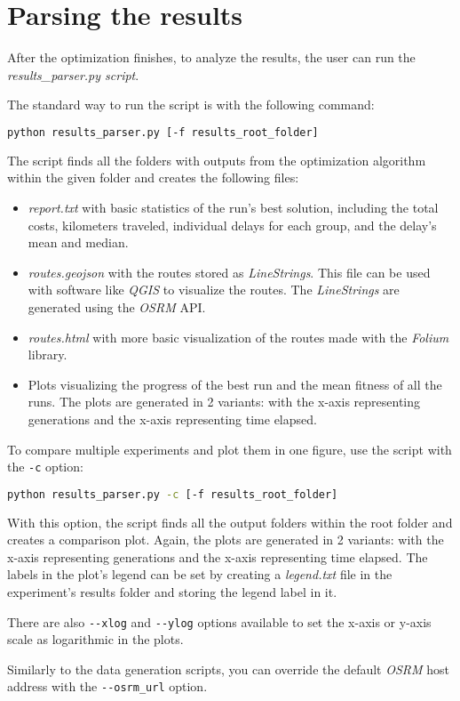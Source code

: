 \section{Parsing the results}

After the optimization finishes, to analyze the results, the user can run the \textit{results\_parser.py script}.

The standard way to run the script is with the following command:

\begin{lstlisting}[language=bash]
    python results_parser.py [-f results_root_folder] 
\end{lstlisting}

The script finds all the folders with outputs from the optimization algorithm within the given folder and creates the following files:

\begin{itemize}
    \setlength\itemsep{0pt}
    \item \textit{report.txt} with basic statistics of the run's best solution, including the total costs, kilometers traveled, individual delays for each group, and the delay's mean and median.
    \item \textit{routes.geojson} with the routes stored as \textit{LineStrings}. This file can be used with software like \textit{QGIS} to visualize the routes. The \textit{LineStrings} are generated using the \textit{OSRM} API.
    \item \textit{routes.html} with more basic visualization of the routes made with the \textit{Folium} library.
    \item Plots visualizing the progress of the best run and the mean fitness of all the runs. The plots are generated in 2 variants: with the x-axis representing generations and the x-axis representing time elapsed.
\end{itemize}

To compare multiple experiments and plot them in one figure, use the script with the \texttt{-c} option:

\begin{lstlisting}[language=bash]
    python results_parser.py -c [-f results_root_folder] 
\end{lstlisting}

With this option, the script finds all the output folders within the root folder and creates a comparison plot. Again, the plots are generated in 2 variants: with the x-axis representing generations and the x-axis representing time elapsed. The labels in the plot's legend can be set by creating a \textit{legend.txt} file in the experiment's results folder and storing the legend label in it.

There are also \texttt{-{}-xlog} and \texttt{-{}-ylog} options available to set the x-axis or y-axis scale as logarithmic in the plots.

Similarly to the data generation scripts, you can override the default \textit{OSRM} host address with the \texttt{-{}-osrm\_url} option.




